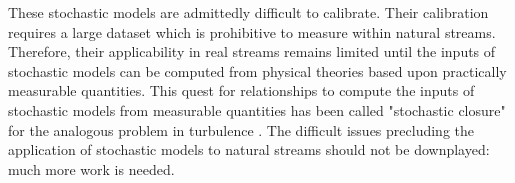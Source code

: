 These stochastic models are admittedly difficult to calibrate. 
Their calibration requires a large dataset which is prohibitive to measure within natural streams. 
Therefore, their applicability in real streams remains limited until the inputs of stochastic models can be computed from physical theories based upon practically measurable quantities. 
This quest for relationships to compute the inputs of stochastic models from measurable quantities has been called "stochastic closure" for the analogous problem in turbulence \citep{Heyman2016}. 
The difficult issues precluding the application of stochastic models to natural streams should not be downplayed: much more work is needed. 


\endinput

Any text after an \endinput is ignored.
You could put scraps here or things in progress.
